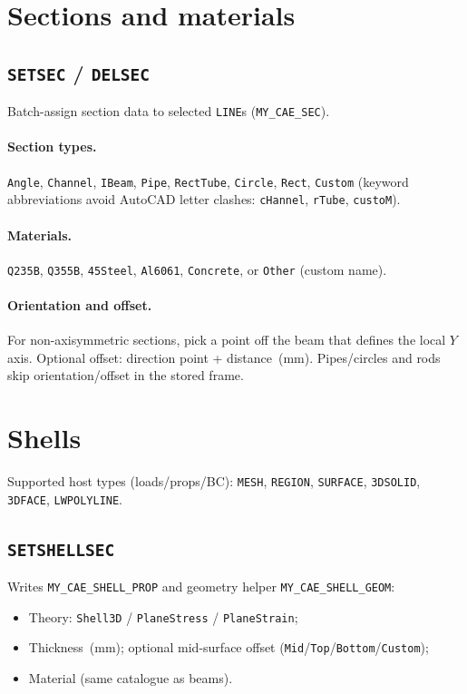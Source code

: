 \documentclass[a4paper]{ltxdoc}
\newcommand{\cadcmd}[1]{\texttt{\textbf{#1}}}
\newcommand{\appid}[1]{\texttt{#1}}
\begin{document}
\section{Sections and materials}

\subsection{\cadcmd{SETSEC} / \cadcmd{DELSEC}}
Batch-assign section data to selected \texttt{LINE}s
(\appid{MY\_CAE\_SEC}).

\paragraph{Section types.}
\texttt{Angle}, \texttt{Channel}, \texttt{IBeam}, \texttt{Pipe},
\texttt{RectTube}, \texttt{Circle}, \texttt{Rect}, \texttt{Custom}
(keyword abbreviations avoid AutoCAD letter clashes:
\texttt{cHannel}, \texttt{rTube}, \texttt{custoM}).

\paragraph{Materials.}
\texttt{Q235B}, \texttt{Q355B}, \texttt{45Steel}, \texttt{Al6061},
\texttt{Concrete}, or \texttt{Other} (custom name).

\paragraph{Orientation and offset.}
For non-axisymmetric sections, pick a point off the beam that defines the
local $Y$ axis.  Optional offset: direction point + distance~(mm).
Pipes/circles and rods skip orientation/offset in the stored frame.

\section{Shells}

Supported host types (loads/props/BC): \texttt{MESH}, \texttt{REGION},
\texttt{SURFACE}, \texttt{3DSOLID}, \texttt{3DFACE}, \texttt{LWPOLYLINE}.

\subsection{\cadcmd{SETSHELLSEC}}
Writes \appid{MY\_CAE\_SHELL\_PROP} and geometry helper
\appid{MY\_CAE\_SHELL\_GEOM}:
\begin{itemize}[nosep]
  \item Theory: \texttt{Shell3D} / \texttt{PlaneStress} / \texttt{PlaneStrain};
  \item Thickness~(mm); optional mid-surface offset
        (\texttt{Mid}/\texttt{Top}/\texttt{Bottom}/\texttt{Custom});
  \item Material (same catalogue as beams).
\end{itemize}
\end{document}

